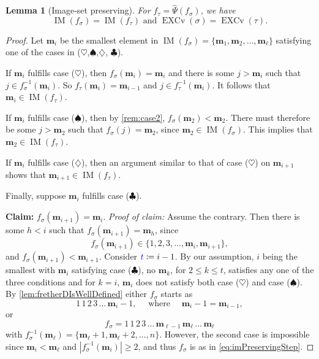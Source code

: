 \documentclass[reqno]{amsart}
\newtheorem{lemma}[theorem]{Lemma}
\theoremstyle{definition}
\newcommand{\defin}[1]{%
\relax\ifmmode%
\textcolor{blue}{#1}%
\else\textcolor{blue}{\emph{#1}}%
\fi%
}
\newcommand{\fretherD}{\hat{\Psi}}
\newcommand{\caseOne}{\ensuremath{\heartsuit}}
\newcommand{\caseTwo}{\ensuremath{\spadesuit}}
\newcommand{\caseThree}{\ensuremath{\diamondsuit}}
\newcommand{\caseFour}{\ensuremath{\clubsuit}}
\newcommand{\img}{\mathbf{m}}
\DeclareMathOperator{\EXCv}{EXCv}
\DeclareMathOperator{\supp}{IM}
\begin{document}
\begin{lemma}[Image-set preserving]\label{lem:imPreserving}
For $f_{\tau}=\fretherD(f_{\sigma})$, we have 
\begin{equation}\label{eq:imPreserving}
\supp(f_{\sigma}) = \supp(f_{\tau}) \text{ and }
\EXCv(\sigma) = \EXCv(\tau). 
\end{equation}
\end{lemma}
\begin{proof}
Let $\img_i$ be the smallest element in 
$\supp(f_{\sigma})=\{\img_1,\img_2,\dotsc,\img_\ell\}$ 
satisfying one of the cases in (\caseOne,\caseTwo,\caseThree, \caseFour).

If $\img_i$ fulfills case (\caseOne), then 
$f_{\sigma}(\img_i)=\img_i$ and there is some $j>\img_i$ such 
that $j\in f_{\sigma}^{-1}(\img_i)$. So 
$f_{\tau}(\img_i)=\img_{i-1}$ and $j\in 
f_{\tau}^{-1}(\img_i)$. It follows that $\img_i\in \supp(f_{\tau})$.
\medskip

If $\img_i$ fulfills case (\caseTwo), then by \cref{rem:case2},
$f_{\sigma}(\img_2)<\img_2$. 
There must therefore be some $j>\img_2$ such that $f_\sigma(j)=\img_2$,
since $\img_2 \in \supp(f_\sigma)$.
This implies that $\img_2\in \supp(f_{\tau})$. 
\medskip

If $\img_i$ fulfills case (\caseThree), then an argument similar  to that 
of case (\caseOne) on $\img_{i+1}$ shows that $\img_{i+1}\in \supp(f_{\tau})$.
\medskip


Finally, suppose $\img_i$ fulfills case (\caseFour).
\smallskip 

\textbf{Claim:} $f_{\sigma}(\img_{i+1})=\img_i$. \emph{Proof of claim:}
Assume the contrary. Then there is some $h<i$ such that 
$f_{\sigma}(\img_{i+1})=\img_h$, 
since  
\[
f_{\sigma}(\img_{i+1}) \in \{1,2,3,\ldots, \img_i,\img_{i+1}\},
\]
and  
$f_{\sigma}(\img_{i+1})<\img_{i+1}$.
%
Consider $\defin{t} \coloneqq i-1$. 
By our assumption, $i$ being the smallest with 
$\img_i$ satisfying case (\caseFour), no $\img_k$, for $2\leq 
k\leq t$, satisfies any one of the three 
conditions and for $k=i$, $\img_i$ does not satisfy 
both case (\caseOne) and case (\caseTwo).
By \cref{lem:fretherDIsWellDefined} either $f_{\sigma}$ starts as 
\begin{equation}\label{eq:imPreservingStep}
1\,1\,2\,3\,\dotsc\,\img_i{-}1, \quad \text{ where }\quad  \img_i{-}1= \img_{i-1}, 
\end{equation}
or 
\[
f_{\sigma}=1\,1\,2\,3\,\dotsc\,\img_{\ell-1}\,\img_\ell\,\dotsc\,\img_\ell
\]
with $f_{\sigma}^{-1}(\img_\ell)=\{\img_\ell+1,\img_\ell+2,\dotsc,n\}$. 
%
However, the second case is impossible since 
$\img_i<\img_\ell$ and $|f_\sigma^{-1}(\img_i)|\geq 2$,
and thus $f_{\sigma}$ is as in \eqref{eq:imPreservingStep}.


\end{proof}
\end{document}
